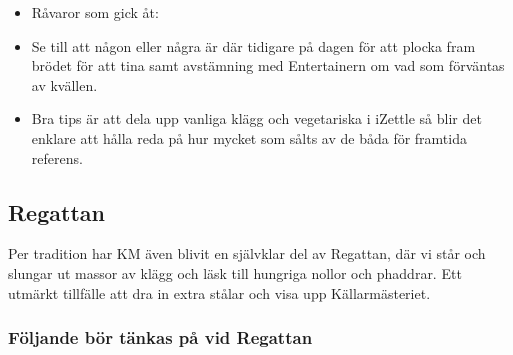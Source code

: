 \documentclass[10pt]{article}
\begin{document}
\begin{itemize}
    \item Råvaror som gick åt:
    \item Se till att någon eller några är där tidigare på dagen för att plocka fram brödet för att tina samt avstämning med Entertainern om vad som förväntas av kvällen.
    \item Bra tips är att dela upp vanliga klägg och vegetariska i iZettle så blir det enklare att hålla reda på hur mycket som sålts av de båda för framtida referens.

\end{itemize}

\subsection{Regattan}
Per tradition har KM även blivit en självklar del av Regattan, där vi står och slungar ut massor av klägg och läsk till hungriga nollor och phaddrar. Ett utmärkt tillfälle att dra in extra stålar och visa upp Källarmästeriet.

\subsubsection*{Följande bör tänkas på vid Regattan}
\end{document}
